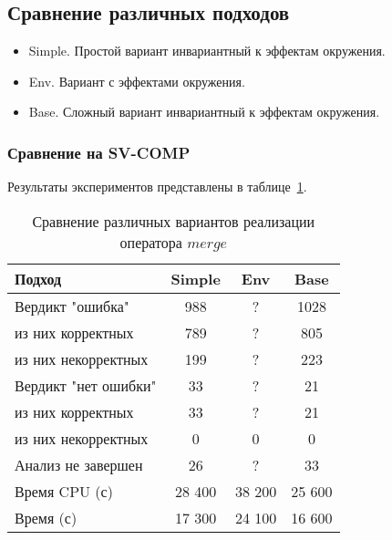 \subsection{Сравнение различных подходов }

\begin{itemize}
\item Simple. Простой вариант инвариантный к эффектам окружения.
\item Env. Вариант с эффектами окружения.
\item Base. Сложный вариант инвариантный к эффектам окружения.
\end{itemize}

\subsubsection{Сравнение на SV-COMP}
Результаты экспериментов представлены в таблице~\ref{table-svcomp-thread}.

\begin{center}
  \begin{table}[h]\footnotesize
  	\label{table-svcomp-thread}
    \caption{Сравнение различных вариантов реализации оператора $merge$}
    \begin{tabular}{ | l | c | c | c | }
      \hline
      Подход         				& Simple   	& Env 		& Base  	\\ \hline
      Вердикт "ошибка" 				& 988    	& ?       & 1028       \\ 
  \hspace{0.5cm} из них корректных 	& 789 		& ? 		& 805    	\\ 
  \hspace{0.5cm} из них некорректных & 199 		& ? 		& 223     	\\ \hline
      Вердикт "нет ошибки"  		& 33      	& ?        & 21       	\\ 
  \hspace{0.5cm} из них корректных 	& 33 		& ?    	& 21      	\\
  \hspace{0.5cm} из них некорректных & 0 		& 0    		& 0     	\\ \hline
      Анализ не завершен       		& 26     	& ?        & 33    	\\ \hline
      Время CPU (с)   				& 28 400 	& 38 200    & 25 600  	\\ 
      Время (с)  					& 17 300 	& 24 100    & 16 600    \\
      \hline
    \end{tabular}
  \end{table}
\end{center}

